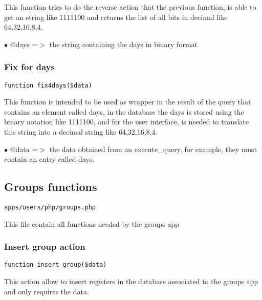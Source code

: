 \documentclass[a4paper]{article}
\begin{document}
This function tries to do the reverse action that the previous function,
is able to get an string like 1111100 and returns the list of all bits in
decimal like 64,32,16,8,4.

\begin{compactitem}
\item[\color{myblue}$\bullet$] @days =$>$ the string containing the days in binary format
\end{compactitem}

\hypertarget{toc163}{}
\subsubsection{Fix for days}

\begin{lstlisting}
function fix4days($data)
\end{lstlisting}

This function is intended to be used as wrapper in the result of the query
that contains an element called days, in the database the days is stored
using the binary notation like 1111100, and for the user interface, is needed
to translate this string into a decimal string like 64,32,16,8,4.

\begin{compactitem}
\item[\color{myblue}$\bullet$] @data =$>$ the data obtained from an execute\_query, for example, they must contain
         an entry called days.
\end{compactitem}

\hypertarget{toc164}{}
\subsection{Groups functions}

\begin{lstlisting}
apps/users/php/groups.php
\end{lstlisting}

This file contain all functions needed by the groups app

\hypertarget{toc165}{}
\subsubsection{Insert group action}

\begin{lstlisting}
function insert_group($data)
\end{lstlisting}

This action allow to insert registers in the database associated to
the groups app and only requires the data.
\end{document}
